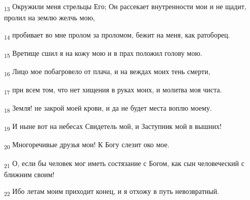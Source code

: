 \begin{tcolorbox}
\textsubscript{13} Окружили меня стрельцы Его; Он рассекает внутренности мои и не щадит, пролил на землю желчь мою,
\end{tcolorbox}
\begin{tcolorbox}
\textsubscript{14} пробивает во мне пролом за проломом, бежит на меня, как ратоборец.
\end{tcolorbox}
\begin{tcolorbox}
\textsubscript{15} Вретище сшил я на кожу мою и в прах положил голову мою.
\end{tcolorbox}
\begin{tcolorbox}
\textsubscript{16} Лицо мое побагровело от плача, и на веждах моих тень смерти,
\end{tcolorbox}
\begin{tcolorbox}
\textsubscript{17} при всем том, что нет хищения в руках моих, и молитва моя чиста.
\end{tcolorbox}
\begin{tcolorbox}
\textsubscript{18} Земля! не закрой моей крови, и да не будет места воплю моему.
\end{tcolorbox}
\begin{tcolorbox}
\textsubscript{19} И ныне вот на небесах Свидетель мой, и Заступник мой в вышних!
\end{tcolorbox}
\begin{tcolorbox}
\textsubscript{20} Многоречивые друзья мои! К Богу слезит око мое.
\end{tcolorbox}
\begin{tcolorbox}
\textsubscript{21} О, если бы человек мог иметь состязание с Богом, как сын человеческий с ближним своим!
\end{tcolorbox}
\begin{tcolorbox}
\textsubscript{22} Ибо летам моим приходит конец, и я отхожу в путь невозвратный.
\end{tcolorbox}
